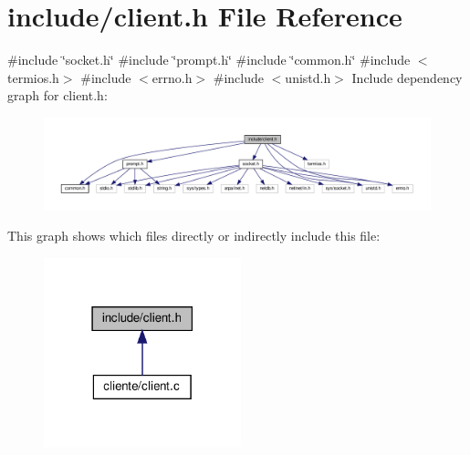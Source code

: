 \section{include/client.h File Reference}
\label{client_8h}
{\ttfamily \#include \char`\"{}socket.\+h\char`\"{}}\newline
{\ttfamily \#include \char`\"{}prompt.\+h\char`\"{}}\newline
{\ttfamily \#include \char`\"{}common.\+h\char`\"{}}\newline
{\ttfamily \#include $<$termios.\+h$>$}\newline
{\ttfamily \#include $<$errno.\+h$>$}\newline
{\ttfamily \#include $<$unistd.\+h$>$}\newline
Include dependency graph for client.\+h\+:
\nopagebreak
\begin{figure}[H]
\begin{center}
\leavevmode
\includegraphics[width=350pt]{client_8h__incl}
\end{center}
\end{figure}
This graph shows which files directly or indirectly include this file\+:
\nopagebreak
\begin{figure}[H]
\begin{center}
\leavevmode
\includegraphics[width=162pt]{client_8h__dep__incl}
\end{center}
\end{figure}
